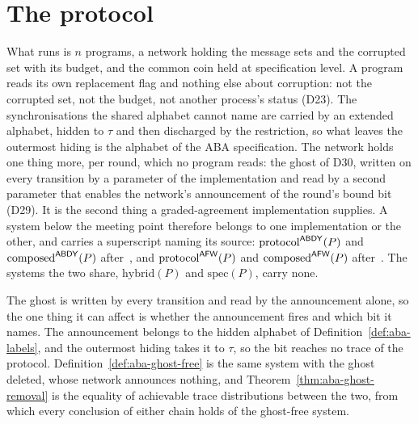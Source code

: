 \section{The protocol}
\label{sec:aba-protocol}

What runs is $n$ programs, a network holding the message sets and the corrupted set with its budget, and the common coin held at specification level.
A program reads its own replacement flag and nothing else about corruption: not the corrupted set, not the budget, not another process's status (D23).
The synchronisations the shared alphabet cannot name are carried by an extended alphabet, hidden to $\tau$ and then discharged by the restriction, so what leaves the outermost hiding is the alphabet of the ABA specification.
The network holds one thing more, per round, which no program reads: the ghost of D30, written on every transition by a parameter of the implementation and read by a second parameter that enables the network's announcement of the round's bound bit (D29).
It is the second thing a graded-agreement implementation supplies.
A system below the meeting point therefore belongs to one implementation or the other, and carries a superscript naming its source: $\mathrm{protocol}^{\mathsf{ABDY}}(P)$ and $\mathrm{composed}^{\mathsf{ABDY}}(P)$ after~\cite{ABDY22}, and $\mathrm{protocol}^{\mathsf{AFW}}(P)$ and $\mathrm{composed}^{\mathsf{AFW}}(P)$ after~\cite{AFW25}.
The systems the two share, $\mathrm{hybrid}(P)$ and $\mathrm{spec}(P)$, carry none.

The ghost is written by every transition and read by the announcement alone, so the one thing it can affect is whether the announcement fires and which bit it names.
The announcement belongs to the hidden alphabet of Definition~\ref{def:aba-labels}, and the outermost hiding takes it to $\tau$, so the bit reaches no trace of the protocol.
Definition~\ref{def:aba-ghost-free} is the same system with the ghost deleted, whose network announces nothing, and Theorem~\ref{thm:aba-ghost-removal} is the equality of achievable trace distributions between the two, from which every conclusion of either chain holds of the ghost-free system.


